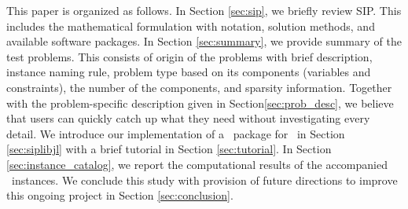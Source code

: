 
This paper is organized as follows. In Section \ref{sec:sip}, we briefly review SIP. This includes the mathematical formulation with notation, solution methods, and available software packages. In Section \ref{sec:summary}, we provide summary of the test problems. This consists of origin of the problems with brief description, instance naming rule, problem type based on its components (variables and constraints), the number of the components, and sparsity information. Together with the problem-specific description given in Section\ref{sec:prob_desc}, we believe that users can quickly catch up what they need without investigating every detail. We introduce our implementation of a \julia\ package for \siplibtwo\ in Section \ref{sec:siplibjl} with a brief tutorial in Section \ref{sec:tutorial}. In Section \ref{sec:instance_catalog}, we report the computational results of the accompanied \smps\ instances. We conclude this study with provision of future directions to improve this ongoing project in Section \ref{sec:conclusion}. 







